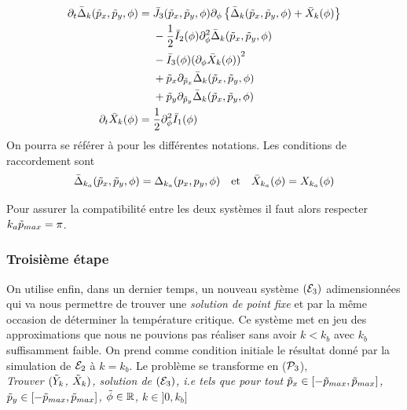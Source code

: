\documentclass[10.5pt]{article}
\begin{document}
\begin{multicols}{2}
\begin{align}
	\partial_t  \bar{\Delta}_k (\tilde{p}_x, \tilde{p}_y, \phi) & = 
	\begin{aligned}[t]
	&  \bar{J}_3(\tilde{p}_x, \tilde{p}_y, \phi) \partial_{\phi} \left\{ \bar{\Delta}_k (\tilde{p}_x, \tilde{p}_y, \phi) + \bar{X}_k(\phi) \right\} \\
	&  - \frac{1}{2} \bar{I}_2(\phi) \partial_{\phi}^2 \bar{\Delta}_k(\tilde{p}_x, \tilde{p}_y, \phi) \\
	& - \bar{I}_3(\phi){(\partial_{\phi} \bar{X}_k(\phi))}^2 \\
	& + \tilde{p}_x \partial_{\tilde{p}_x} \bar{\Delta}_k (\tilde{p}_x, \tilde{p}_y, \phi)  \\
	& + \tilde{p}_y \partial_{\tilde{p}_y}  \bar{\Delta}_k (\tilde{p}_x, \tilde{p}_y, \phi) 
	\end{aligned}
	\label{eqn} \\
	\partial_t \bar{X}_k(\phi) & = 
	\begin{aligned}[t]
		& \frac{1}{2} \partial_{\phi}^2 \bar{I}_1(\phi)
	\end{aligned}
\end{align}
On pourra se référer à  pour les différentes notations. Les conditions de raccordement sont
\begin{equation*}
\bar{\Delta}_{k_a}(\tilde{p}_x, \tilde{p}_y, \phi) = \Delta_{k_a}(p_x, p_y, \phi) \quad \text{et} \quad \bar{X}_{k_a}(\phi) = X_{k_a}(\phi)
\end{equation*}

Pour assurer la compatibilité entre les deux systèmes il faut alors respecter $k_a\tilde{p}_{max} = \pi$. \\




\subsubsection{Troisième étape}

On utilise enfin, dans un dernier temps, un nouveau système $(\mathcal{E}_3)$ adimensionnées qui va nous permettre de trouver une \textit{solution de point fixe} et par la même occasion de déterminer la température critique. Ce système met en jeu des approximations que nous ne pouvions pas réaliser sans avoir $k < k_b$ avec $k_b$ suffisamment faible. On prend comme condition initiale le résultat donné par la simulation de $\mathcal{E}_2$ à $k = k_b$. Le problème se transforme en ($\mathcal{P}_3$), \\

\noindent
{\itshape Trouver $(\tilde{Y}_k$, $\tilde{X}_k)$, solution de $(\mathcal{E}_3)$, i.e tels que pour tout $\tilde{p}_x \in [-\tilde{p}_{max}, \tilde{p}_{max}]$, $\tilde{p}_y \in [-\tilde{p}_{max}, \tilde{p}_{max}]$, $\tilde{\phi} \in \mathbb{R}$, $k\in ]0, k_b]$}


\end{multicols}
\end{document}

